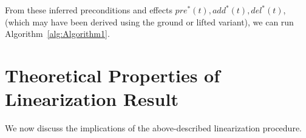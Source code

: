 \documentclass[letterpaper]{article} %
\newcommand{\PreS} {\ensuremath{\mathit{pre^{*}}}}
\newcommand{\AddS} {\ensuremath{\mathit{add^{*}}}}
\newcommand{\DelS} {\ensuremath{\mathit{del^{*}}}}
\newcommand{\RelEffPlus} {\ensuremath{\mathit{eff^{\emptyset +}_{*}}}}
\newcommand{\RelEffMinus} {\ensuremath{\mathit{eff^{\emptyset -}_{*}}}}
\begin{document}
From these inferred preconditions and effects $\PreS(t), \AddS(t), \DelS(t)$, (which may have been derived using the ground or lifted variant), we can run Algorithm~\ref{alg:Algorithm1}.
	





\section{Theoretical Properties of Linearization Result}

We now discuss the implications of the above-described linearization procedure.
\end{document}
